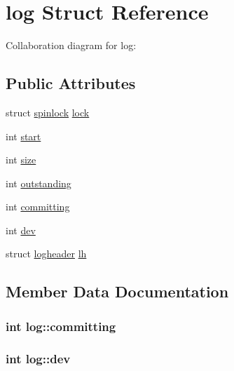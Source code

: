\hypertarget{structlog}{}\section{log Struct Reference}
\label{structlog}


Collaboration diagram for log\+:
\subsection*{Public Attributes}
\begin{DoxyCompactItemize}
\item 
struct \hyperlink{structspinlock}{spinlock} \hyperlink{structlog_a980a1d1aa9c60af7a82f297f8ab54d2e}{lock}
\item 
int \hyperlink{structlog_a28d847dd722497fa3497b14f68267618}{start}
\item 
int \hyperlink{structlog_a2257e716d4b77efd0524286cf5772a41}{size}
\item 
int \hyperlink{structlog_addfc1fc09a124978bd7e2a23a19d733d}{outstanding}
\item 
int \hyperlink{structlog_afc034b98b98897c179ca8fae8e2ee181}{committing}
\item 
int \hyperlink{structlog_aebeeb9df7326549fb5d8b7221c9b0aa3}{dev}
\item 
struct \hyperlink{structlogheader}{logheader} \hyperlink{structlog_a7808516ed2f708dcb13912b1e8fc20d9}{lh}
\end{DoxyCompactItemize}


\subsection{Member Data Documentation}
\subsubsection[{\texorpdfstring{committing}{committing}}]{\setlength{\rightskip}{0pt plus 5cm}int log\+::committing}\hypertarget{structlog_afc034b98b98897c179ca8fae8e2ee181}{}\label{structlog_afc034b98b98897c179ca8fae8e2ee181}
\subsubsection[{\texorpdfstring{dev}{dev}}]{\setlength{\rightskip}{0pt plus 5cm}int log\+::dev}\hypertarget{structlog_aebeeb9df7326549fb5d8b7221c9b0aa3}{}\label{structlog_aebeeb9df7326549fb5d8b7221c9b0aa3}
